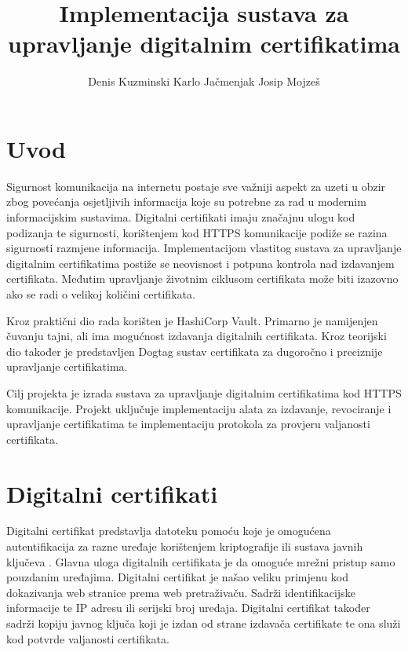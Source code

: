 \documentclass[]{foi}
\title{Implementacija sustava za upravljanje digitalnim certifikatima}
\author{Denis Kuzminski \newline Karlo Jačmenjak \newline Josip Mojzeš}
\begin{document}
\maketitle

\tableofcontents

\makeatletter {} \makeatother
\pagestyle{plain}

\chapter{Uvod}

Sigurnost komunikacija na internetu postaje sve važniji aspekt za uzeti u obzir zbog povećanja osjetljivih informacija koje su potrebne za rad u modernim informacijskim sustavima.
Digitalni certifikati imaju značajnu ulogu kod podizanja te sigurnosti, korištenjem kod HTTPS komunikacije podiže se razina sigurnosti razmjene informacija.
Implementacijom vlastitog sustava za upravljanje digitalnim certifikatima postiže se neovisnost i potpuna kontrola nad izdavanjem certifikata.
Međutim upravljanje životnim ciklusom certifikata može biti izazovno ako se radi o velikoj količini certifikata.

Kroz praktični dio rada korišten je HashiCorp Vault.
Primarno je namijenjen čuvanju tajni, ali ima mogućnost izdavanja digitalnih certifikata.
Kroz teorijski dio također je predstavljen Dogtag sustav certifikata za dugoročno i preciznije upravljanje certifikatima.

Cilj projekta je izrada sustava za upravljanje digitalnim certifikatima kod HTTPS komunikacije.
Projekt uključuje implementaciju alata za izdavanje, revociranje i upravljanje certifikatima te implementaciju protokola za provjeru valjanosti certifikata.


\chapter{Digitalni certifikati}

Digitalni certifikat predstavlja datoteku pomoću koje je omogućena autentifikacija za razne uređaje korištenjem kriptografije ili sustava javnih ključeva \cite{fortinet-digital-certificates}.
Glavna uloga digitalnih certifikata je da omoguće mrežni pristup samo pouzdanim uređajima.
Digitalni certifikat je našao veliku primjenu kod dokazivanja web stranice prema web pretraživaču.
Sadrži identifikacijske informacije te IP adresu ili serijski broj uređaja.
Digitalni certifikat također sadrži kopiju javnog ključa koji je izdan od strane izdavača certifikate te ona služi kod potvrde valjanosti certifikata.
\end{document}
